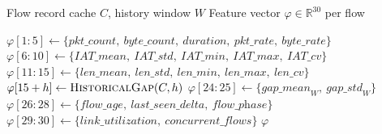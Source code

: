 \begin{algorithm}
\caption{Flow Feature Extraction (30-dimensional)}
\label{alg:feature-extraction}
\begin{algorithmic}[1]
\Require Flow record cache $C$, history window $W$
\Ensure Feature vector $\varphi \in \mathbb{R}^{30}$ per flow

  \State {}
  \State $\varphi[1\!:\!5] \leftarrow \{\textit{pkt\_count},\ \textit{byte\_count},\ \textit{duration},\ \textit{pkt\_rate},\ \textit{byte\_rate}\}$
  \State {}
  \State $\varphi[6\!:\!10] \leftarrow \{\textit{IAT\_mean},\ \textit{IAT\_std},\ \textit{IAT\_min},\ \textit{IAT\_max},\ \textit{IAT\_cv}\}$
  \State {}
  \State $\varphi[11\!:\!15] \leftarrow \{\textit{len\_mean},\ \textit{len\_std},\ \textit{len\_min},\ \textit{len\_max},\ \textit{len\_cv}\}$
  \State {}
    \State $\varphi[15+h] \leftarrow \textsc{HistoricalGap}(C, h)$
  \EndFor
  \State $\varphi[24\!:\!25] \leftarrow \{\textit{gap\_mean}_W,\ \textit{gap\_std}_W\}$
  \State {}
  \State $\varphi[26\!:\!28] \leftarrow \{\textit{flow\_age},\ \textit{last\_seen\_delta},\ \textit{flow\_phase}\}$
  \State {}
  \State $\varphi[29\!:\!30] \leftarrow \{\textit{link\_utilization},\ \textit{concurrent\_flows}\}$
  \State \Return $\varphi$
\EndFunction
\end{algorithmic}
\end{algorithm}

